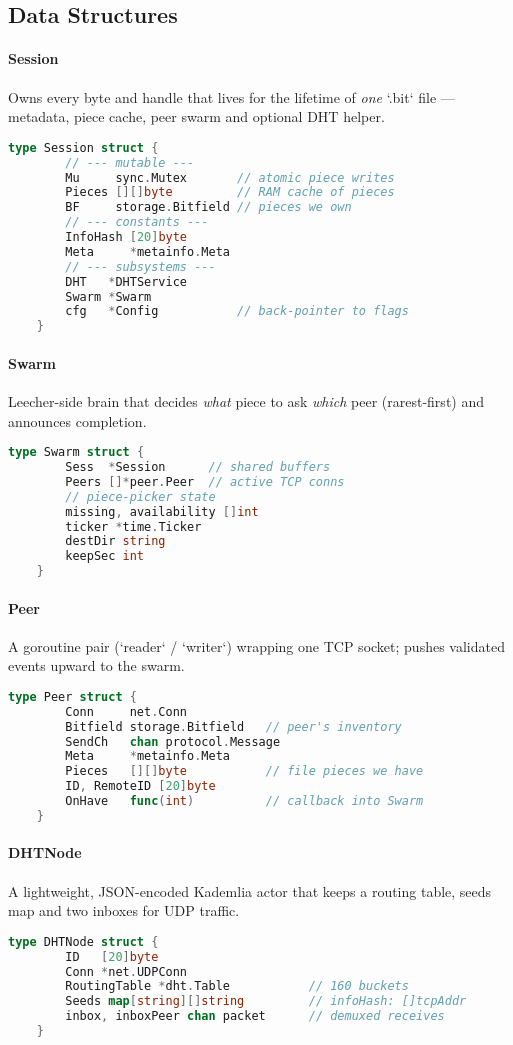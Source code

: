 \documentclass[11pt,a4paper]{article}
\begin{document}
\subsection{Data Structures}

\paragraph{Session} Owns every byte and handle that lives for the lifetime of \emph{one} `.bit` file — metadata, piece cache, peer swarm and optional DHT helper.
\begin{lstlisting}[language=go]
	type Session struct {
		// --- mutable ---
		Mu     sync.Mutex       // atomic piece writes
		Pieces [][]byte         // RAM cache of pieces
		BF     storage.Bitfield // pieces we own
		// --- constants ---
		InfoHash [20]byte
		Meta     *metainfo.Meta
		// --- subsystems ---
		DHT   *DHTService
		Swarm *Swarm
		cfg   *Config           // back-pointer to flags
	}
\end{lstlisting}

\paragraph{Swarm} Leecher-side brain that decides \emph{what} piece to ask \emph{which} peer (rarest-first) and announces completion.
\begin{lstlisting}[language=go]
	type Swarm struct {
		Sess  *Session      // shared buffers
		Peers []*peer.Peer  // active TCP conns
		// piece-picker state
		missing, availability []int
		ticker *time.Ticker
		destDir string
		keepSec int
	}
\end{lstlisting}

\paragraph{Peer} A goroutine pair (`reader` / `writer`) wrapping one TCP socket; pushes validated events upward to the swarm.
\begin{lstlisting}[language=go]
	type Peer struct {
		Conn     net.Conn
		Bitfield storage.Bitfield   // peer's inventory
		SendCh   chan protocol.Message
		Meta     *metainfo.Meta
		Pieces   [][]byte           // file pieces we have
		ID, RemoteID [20]byte
		OnHave   func(int)          // callback into Swarm
	}
\end{lstlisting}

\paragraph{DHTNode} A lightweight, JSON-encoded Kademlia actor that keeps a routing table, seeds map and two inboxes for UDP traffic.
\begin{lstlisting}[language=go]
	type DHTNode struct {
		ID   [20]byte
		Conn *net.UDPConn
		RoutingTable *dht.Table           // 160 buckets
		Seeds map[string][]string         // infoHash: []tcpAddr
		inbox, inboxPeer chan packet      // demuxed receives
	}
\end{lstlisting}
\end{document}
